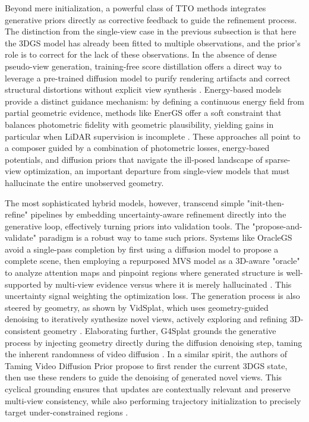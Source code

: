 \documentclass[11pt,a4paper]{article}
\begin{document}
Beyond mere initialization, a powerful class of TTO methods integrates generative priors directly as corrective feedback to guide the refinement process. The distinction from the single-view case in the previous subsection is that here the 3DGS model has already been fitted to multiple observations, and the prior's role is to correct for the lack of these observations. In the absence of dense pseudo-view generation, training-free score distillation offers a direct way to leverage a pre-trained diffusion model to purify rendering artifacts and correct structural distortions without explicit view synthesis \cite{arxiv:2509.18759v1}. Energy-based models provide a distinct guidance mechanism: by defining a continuous energy field from partial geometric evidence, methods like EnerGS offer a soft constraint that balances photometric fidelity with geometric plausibility, yielding gains in particular when LiDAR supervision is incomplete \cite{arxiv:2604.26238v1}. These approaches all point to a composer guided by a combination of photometric losses, energy-based potentials, and diffusion priors that navigate the ill-posed landscape of sparse-view optimization, an important departure from single-view models that must hallucinate the entire unobserved geometry.

The most sophisticated hybrid models, however, transcend simple "init-then-refine" pipelines by embedding uncertainty-aware refinement directly into the generative loop, effectively turning priors into validation tools. The "propose-and-validate" paradigm is a robust way to tame such priors. Systems like OracleGS avoid a single-pass completion by first using a diffusion model to propose a complete scene, then employing a repurposed MVS model as a 3D-aware "oracle" to analyze attention maps and pinpoint regions where generated structure is well-supported by multi-view evidence versus where it is merely hallucinated \cite{arxiv:2509.23258v2}. This uncertainty signal weighting the optimization loss. The generation process is also steered by geometry, as shown by VidSplat, which uses geometry-guided denoising to iteratively synthesize novel views, actively exploring and refining 3D-consistent geometry \cite{arxiv:2605.11424v1}. Elaborating further, G4Splat grounds the generative process by injecting geometry directly during the diffusion denoising step, taming the inherent randomness of video diffusion \cite{arxiv:2510.12099v2}. In a similar spirit, the authors of Taming Video Diffusion Prior propose to first render the current 3DGS state, then use these renders to guide the denoising of generated novel views. This cyclical grounding ensures that updates are contextually relevant and preserve multi-view consistency, while also performing trajectory initialization to precisely target under-constrained regions \cite{arxiv:2503.05082v1}.
\end{document}
